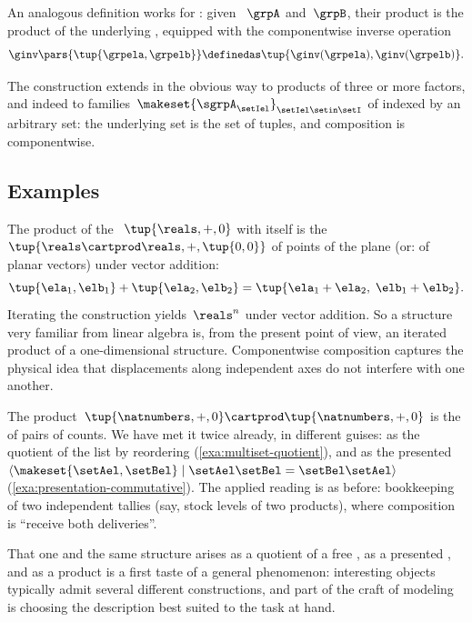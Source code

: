 \begin{remark}
    \label{rem:product-groups}
    An analogous definition works for : given ~$\grpA$ and~$\grpB$, their product is the product of the underlying , equipped with the componentwise inverse operation
    \begin{equation}
        \ginv\pars{\tup{\grpela, \grpelb}} \definedas \tup{\ginv(\grpela), \ginv(\grpelb)}.
    \end{equation}
\end{remark}

\begin{remark}
    The construction extends in the obvious way to products of three or more factors, and indeed to families~$\makeset{\sgrpA_\setIel}_{\setIel \setin \setI}$ of  indexed by an arbitrary set: the underlying set is the set of tuples, and composition is componentwise.
\end{remark}

\subsection{Examples}

\begin{example}
    \label{exa:product-reals-plane}
    The product of the ~$\tup{\reals, +, 0}$ with itself is the ~$\tup{\reals \cartprod \reals, +, \tup{0,0}}$ of points of the plane (or: of planar vectors) under vector addition:
    \begin{equation}
        \tup{\ela_1, \elb_1} + \tup{\ela_2, \elb_2} = \tup{\ela_1 + \ela_2, \; \elb_1 + \elb_2}.
    \end{equation}
    Iterating the construction yields~$\reals^n$ under vector addition.
    So a structure very familiar from linear algebra is, from the present point of view, an iterated product of a one-dimensional structure.
    Componentwise composition captures the physical idea that displacements along independent axes do not interfere with one another.
\end{example}

\begin{example}
    \label{exa:product-inventory}
    The product~$\tup{\natnumbers, +, 0} \cartprod \tup{\natnumbers, +, 0}$ is the  of pairs of counts.
    We have met it twice already, in different guises: as the quotient of the list  by reordering (\cref{exa:multiset-quotient}), and as the presented ~$\langle \makeset{\setAel, \setBel} \mid \setAel\setBel = \setBel\setAel \rangle$ (\cref{exa:presentation-commutative}).
    The applied reading is as before: bookkeeping of two independent tallies (say, stock levels of two products), where composition is ``receive both deliveries''.

    That one and the same structure arises as a quotient of a free , as a presented , and as a product is a first taste of a general phenomenon: interesting objects typically admit several different constructions, and part of the craft of modeling is choosing the description best suited to the task at hand.
\end{example}

